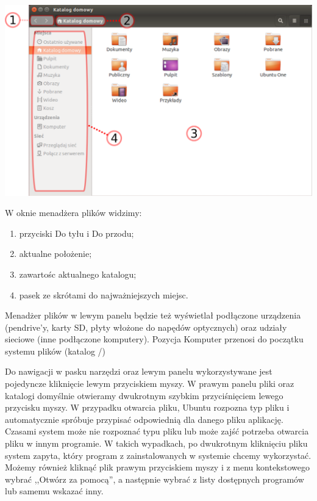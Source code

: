 \begin{center}
	\includegraphics[width=\linewidth]{images/programy_nautilus.png}
\end{center}

W oknie menadżera plików widzimy:
\begin{enumerate}[label=\protect\circled{\arabic*}]
\item przyciski \textcolor{ubuntu_orange}{Do tyłu} i \textcolor{ubuntu_orange}{Do przodu};
\item aktualne położenie;
\item zawartośc aktualnego katalogu;
\item pasek ze skrótami do najważniejszych miejsc.
\end{enumerate}

Menadżer plików w lewym panelu będzie też wyświetlał podłączone urządzenia (pendrive'y, karty SD, płyty włożone do napędów optycznych) oraz udziały sieciowe (inne podłączone komputery). Pozycja \textcolor{ubuntu_orange}{Komputer} przenosi do początku systemu plików (katalog /)

Do nawigacji w pasku narzędzi oraz lewym panelu wykorzystywane jest pojedyncze kliknięcie lewym przyciskiem myszy. W prawym panelu pliki oraz katalogi domyślnie otwieramy dwukrotnym szybkim przyciśnięciem lewego przycisku myszy. W przypadku otwarcia pliku, Ubuntu rozpozna typ pliku i automatycznie spróbuje przypisać odpowiednią dla danego pliku aplikację. Czasami system może nie rozpoznać typu pliku lub może zajść potrzeba otwarcia pliku w innym programie. W takich wypadkach, po dwukrotnym kliknięciu pliku system zapyta, który program z zainstalowanych w systemie chcemy wykorzystać. Możemy również kliknąć plik prawym przyciskiem myszy i z menu kontekstowego wybrać ,,Otwórz za pomocą'', a następnie wybrać z listy dostępnych programów lub samemu wskazać inny.


